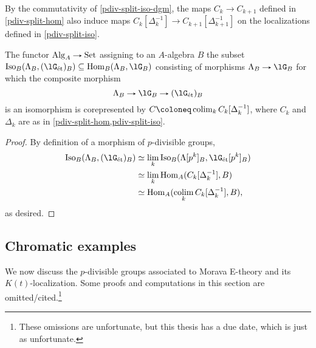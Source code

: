 \begin{remark}
  \label{pdiv-localmaps}
  By the commutativity of \cref{pdiv-split-iso-dgm}, the maps
  $C_k \to C_{k+1}$ defined in \cref{pdiv-split-hom} also induce maps
  $C_k[\Delta_k^{-1}] \to C_{k+1}[\Delta_{k+1}^{-1}]$ on the
  localizations defined in \cref{pdiv-split-iso}.
\end{remark}

\begin{proposition}
  \label{pdiv-split-main}
  The functor $\Alg_A \to \Set$ assigning to an $A$-algebra $B$ the
  subset
  $\Iso_B(\Lambda_B, (\lG_\et)_B) \subseteq
  \Hom_B(\Lambda_B, \lG_B)$
  consisting of morphisms $\Lambda_B \to \lG_B$ for which
  the composite morphism
  \[
  \Lambda_B \to \lG_B \to (\lG_\et)_B
  \]
  is an isomorphism is corepresented by
  $C \ce \colim_k C_k[\Delta_k^{-1}]$, where $C_k$ and $\Delta_k$ are
  as in \cref{pdiv-split-hom,pdiv-split-iso}.
\end{proposition}

\begin{proof}
  By definition of a morphism of $p$-divisible groups,
  \begin{align*}
    \Iso_B(\Lambda_B, (\lG_\et)_B) &\iso
    \lim_k \Iso_B(\Lambda[p^k]_B, \lG_\et[p^k]_B) \\ &\iso
    \lim_k \Hom_A(C_k[\Delta_k^{-1}], B) \\ &\iso
    \Hom_A(\colim_k C_k[\Delta_k^{-1}], B),
  \end{align*}
  as desired.
\end{proof}


\subsection{Chromatic examples}
\label{pdiv-chromex}

We now discuss the $p$-divisible groups associated to Morava E-theory
and its $K(t)$-localization. Some proofs and computations in this
section are omitted/cited.\footnote{These omissions are unfortunate,
  but this thesis has a due date, which is just as unfortunate.}

